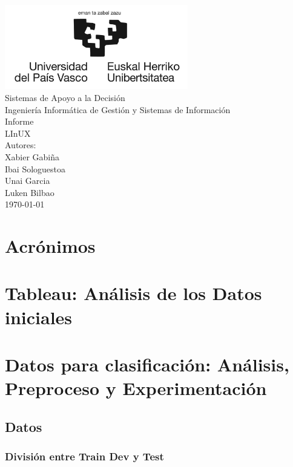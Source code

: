 \documentclass{report}
\begin{document}
    \begin{titlepage}
        \centering
        \includegraphics[width=0.6\textwidth]{./img/logo.jpg}\\
        \vspace{1cm}
        \LARGE Sistemas de Apoyo a la Decisión\\
        \vspace{0.5cm}
        \Large Ingeniería Informática de Gestión y Sistemas de Información\\
        \vspace{3cm}
        \Huge Informe\\
        \huge LInUX\\
        \vspace{2.5cm}
        \Large Autores:\\
        \vspace{0.2cm}
        \large Xabier Gabiña\\
        \large Ibai Sologuestoa\\
        \large Unai Garcia\\
        \large Luken Bilbao\\
        \vfill
        \today
    \end{titlepage}
    \tableofcontents
    \listoffigures
    \listoftables
    \chapter*{Acrónimos}
    \chapter{Tableau: Análisis de los Datos iniciales}
    \chapter{Datos para clasificación: Análisis, Preproceso y Experimentación}
        \section{Datos}
            \subsection{División entre Train Dev y Test}
\end{document}
